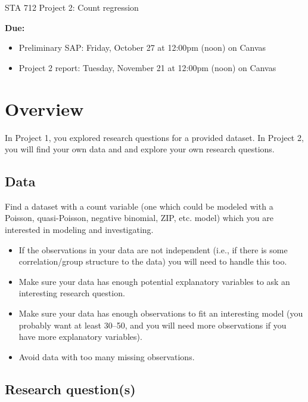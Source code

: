 \documentclass[11pt]{article}
\begin{document}
\begin{center}
\Large
STA 712 Project 2: Count regression\\
\normalsize
\vspace{5mm}
\end{center}

\noindent \textbf{Due:}
\begin{itemize}
\item Preliminary SAP: Friday, October 27 at 12:00pm (noon) on Canvas
\item Project 2 report: Tuesday, November 21 at 12:00pm (noon) on Canvas
\end{itemize}

\section*{Overview}

In Project 1, you explored research questions for a provided dataset. In Project 2, you will find your own data and and explore your own research questions.

\subsection*{Data}

Find a dataset with a count variable (one which could be modeled with a Poisson, quasi-Poisson, negative binomial, ZIP, etc. model) which you are interested in modeling and investigating. 

\begin{itemize}
\item If the observations in your data are not independent (i.e., if there is some correlation/group structure to the data) you will need to handle this too.

\item Make sure your data has enough potential explanatory variables to ask an interesting research question.

\item Make sure your data has enough observations to fit an interesting model (you probably want at least 30--50, and you will need more observations if you have more explanatory variables).

\item Avoid data with too many missing observations.
\end{itemize}

\subsection*{Research question(s)}
\end{document}
